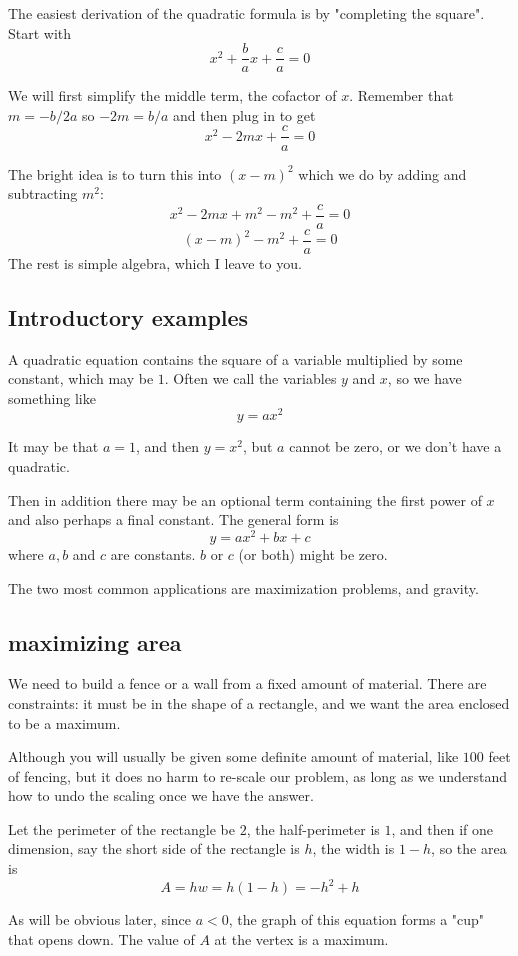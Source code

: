 \documentclass[11pt, oneside]{article}
\begin{document}
The easiest derivation of the quadratic formula is by "completing the square".  Start with
\[ x^2 + \frac{b}{a} x + \frac{c}{a} =  0 \]

We will first simplify the middle term, the cofactor of $x$.  Remember that $m = -b/2a$ so $-2m = b/a$ and then plug in to get
\[ x^2 - 2mx + \frac{c}{a} =  0 \]

The bright idea is to turn this into $(x - m)^2$ which we do by adding and subtracting $m^2$:
\[ x^2 - 2mx + m^2 - m^2 + \frac{c}{a} = 0 \]
\[ (x - m)^2 - m^2 + \frac{c}{a} = 0 \]
The rest is simple algebra, which I leave to you.

\subsection*{Introductory examples}

A quadratic equation contains the square of a variable multiplied by some constant, which may be $1$.  Often we call the variables $y$ and $x$, so we have something like
\[ y = ax^2 \]

It may be that $a = 1$, and then $y = x^2$, but $a$ cannot be zero, or we don't have a quadratic.  

Then in addition there may be an optional term containing the first power of $x$ and also perhaps a final constant.  The general form is
\[ y = ax^2 + bx + c \]
where $a, b$ and $c$ are constants.  $b$ or $c$ (or both) might be zero.

The two most common applications are maximization problems, and gravity.

\subsection*{maximizing area}
We need to build a fence or a wall from a fixed amount of material.  There are constraints:   it must be in the shape of a rectangle, and we want the area enclosed to be a maximum.

Although you will usually be given some definite amount of material, like $100$ feet of fencing, but it does no harm to re-scale our problem, as long as we understand how to undo the scaling once we have the answer.

Let the perimeter of the rectangle be $2$, the half-perimeter is $1$, and then if one dimension, say the short side of the rectangle is $h$, the width is $1 - h$, so the area is
\[ A = hw = h(1 - h) = -h^2 + h \]

As will be obvious later, since $a < 0$, the graph of this equation forms a "cup" that opens down.  The value of $A$ at the vertex is a maximum.
\end{document}
